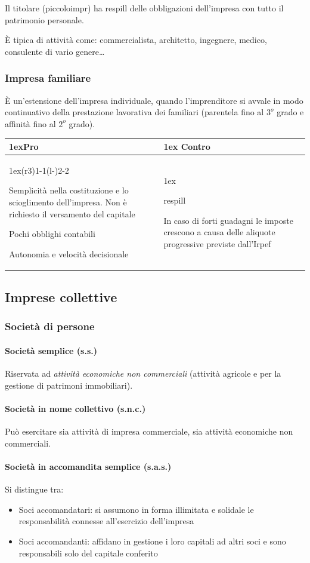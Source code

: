 \documentclass[10pt,a4paper,fleqn,oneside]{book}
\makeatletter
\newcommand{\proandcons}[2]{
    \begin{tabularx}{\linewidth}{>{\parskip1ex}X@{\kern4\tabcolsep}>{\parskip1ex}X}

        \toprule
        \hfil\bfseries Pro
        &
        \hfil\bfseries Contro
        \\\cmidrule(r{3\tabcolsep}){1-1}\cmidrule(l{-\tabcolsep}){2-2}
        
        #1

        &
        #2
        \\\bottomrule
    \end{tabularx}
}
\makeatother
\begin{document}
Il titolare (\gls{piccoloimpr}) ha \gls{respill} delle obbligazioni dell'impresa con tutto il patrimonio personale.

È tipica di attività come: commercialista, architetto, ingegnere, medico,
consulente di vario genere\dots

\subsubsection{Impresa familiare}
È un'estensione dell’impresa individuale, quando l’imprenditore
si avvale in modo continuativo della prestazione lavorativa dei familiari
(parentela fino al $3^o$ grado e affinità fino al $2^o$ grado).

\proandcons{
    Semplicità nella costituzione e lo scioglimento dell'impresa.
    Non è richiesto il versamento del capitale

    Pochi obblighi contabili
    
    Autonomia e velocità decisionale
}{
    \Gls{respill}

    In caso di forti guadagni le imposte crescono a causa delle aliquote
    progressive previste dall'Irpef
}


\subsection{Imprese collettive}

\subsubsection{Società di persone}

\paragraph{Società semplice (s.s.)} Riservata ad \emph{attività economiche non commerciali}
(attività agricole e per la gestione di patrimoni immobiliari).

\paragraph{Società in nome collettivo (s.n.c.)} Può esercitare sia attività di
impresa commerciale, sia attività economiche non commerciali.

\paragraph{Società in accomandita semplice (s.a.s.)} Si distingue tra:
\begin{itemize}
    \item Soci accomandatari: si assumono in forma illimitata e solidale le
    responsabilità connesse all'esercizio dell'impresa
    \item Soci accomandanti: affidano in gestione i loro capitali ad altri soci e
    sono responsabili solo del capitale conferito
\end{itemize}
\end{document}
